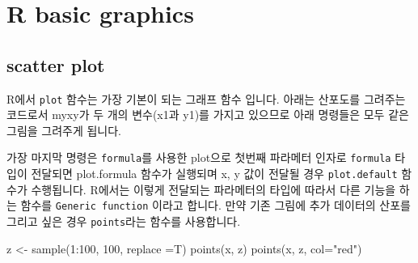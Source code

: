 \documentclass[
]{book}
\newenvironment{Shaded}{\begin{snugshade}}{\end{snugshade}}
\newcommand{\AttributeTok}[1]{\textcolor[rgb]{0.77,0.63,0.00}{#1}}
\newcommand{\DecValTok}[1]{\textcolor[rgb]{0.00,0.00,0.81}{#1}}
\newcommand{\FunctionTok}[1]{\textcolor[rgb]{0.00,0.00,0.00}{#1}}
\newcommand{\NormalTok}[1]{#1}
\newcommand{\OtherTok}[1]{\textcolor[rgb]{0.56,0.35,0.01}{#1}}
\newcommand{\SpecialCharTok}[1]{\textcolor[rgb]{0.00,0.00,0.00}{#1}}
\newcommand{\StringTok}[1]{\textcolor[rgb]{0.31,0.60,0.02}{#1}}
\begin{document}
\hypertarget{r-basic-graphics}{%
\chapter{R basic graphics}\label{r-basic-graphics}}

\hypertarget{scatter-plot}{%
\section{scatter plot}\label{scatter-plot}}

R에서 \texttt{plot} 함수는 가장 기본이 되는 그래프 함수 입니다. 아래는 산포도를 그려주는 코드로서 myxy가 두 개의 변수(x1과 y1)를 가지고 있으므로 아래 명령들은 모두 같은 그림을 그려주게 됩니다.

\begin{Shaded}
\end{Shaded}

가장 마지막 명령은 \texttt{formula}를 사용한 plot으로 첫번째 파라메터 인자로 \texttt{formula} 타입이 전달되면 plot.formula 함수가 실행되며 x, y 값이 전달될 경우 \texttt{plot.default} 함수가 수행됩니다. R에서는 이렇게 전달되는 파라메터의 타입에 따라서 다른 기능을 하는 함수를 \texttt{Generic\ function} 이라고 합니다. 만약 기존 그림에 추가 데이터의 산포를 그리고 싶은 경우 \texttt{points}라는 함수를 사용합니다.

\begin{Shaded}
\begin{Highlighting}[]
\NormalTok{z }\OtherTok{\textless{}{-}} \FunctionTok{sample}\NormalTok{(}\DecValTok{1}\SpecialCharTok{:}\DecValTok{100}\NormalTok{, }\DecValTok{100}\NormalTok{, }\AttributeTok{replace =}\NormalTok{T)}
\FunctionTok{points}\NormalTok{(x, z)}
\FunctionTok{points}\NormalTok{(x, z, }\AttributeTok{col=}\StringTok{"red"}\NormalTok{)}
\end{Highlighting}
\end{Shaded}
\end{document}
